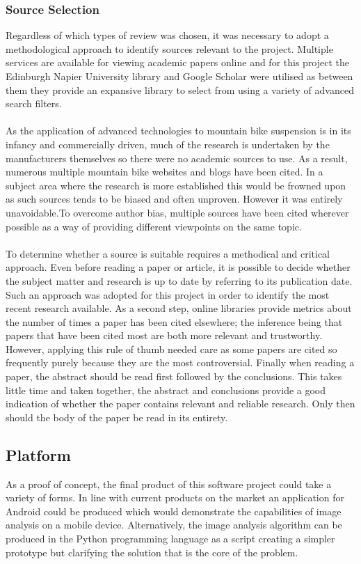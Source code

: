 		\subsubsection{Source Selection}
			Regardless of which types of review was chosen, it was necessary to adopt a methodological approach to identify sources relevant to the project. Multiple services are available for viewing academic papers online and for this project the Edinburgh Napier University library and Google Scholar were utilised as between them they provide  an expansive library to select from  using  a variety of advanced search filters.
			\\\\
			As the   application of advanced technologies to mountain bike suspension is in its infancy and commercially driven, much of the research is undertaken by the manufacturers themselves so there were  no academic sources to use. As a result, numerous  multiple mountain bike websites and blogs have been cited. In a subject area where the research is more established this would be frowned upon as such  sources tends to be biased and often unproven. However it was entirely unavoidable.To overcome author bias,  multiple sources have been cited wherever possible as a way of providing different viewpoints on the same topic.
			\\\\
			To determine whether a source is suitable requires a methodical and critical approach.  Even before reading a  paper or article, it is possible to  decide  whether the subject matter and research is up to date by referring to its  publication date. Such an approach was  adopted for this project in order to identify  the most recent research available. As a second step, online libraries provide metrics about  the number of times a paper has been cited elsewhere; the inference being that  papers that have  been cited most  are both more relevant and  trustworthy. However,  applying this rule of thumb needed care as some papers are  cited so frequently purely because they are the most controversial. Finally when reading a paper, the abstract should be read first followed by the conclusions. This takes little time and taken together, the abstract and conclusions provide a good indication of whether the paper contains  relevant and reliable research. Only then should the body of the paper be read in its entirety. 
	\subsection{Platform}
		As a proof of concept, the final product of this software project could take a variety of forms. In line with current products on the market an application for Android could be produced which would demonstrate the capabilities of image analysis on a mobile device. Alternatively, the image analysis algorithm can be produced in the Python programming language as a script creating a simpler prototype but clarifying the solution that is the core of  the problem.
